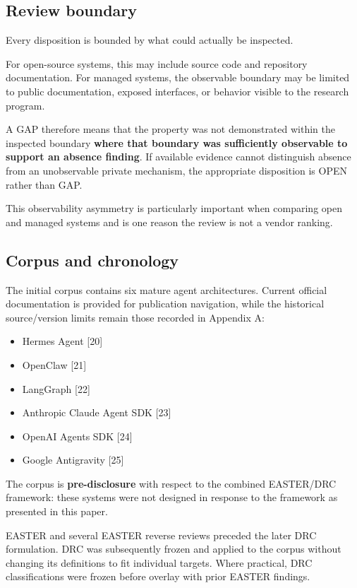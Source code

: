\documentclass[11pt]{article}
\begin{document}
\subsection{Review boundary}

Every disposition is bounded by what could actually be inspected.

For open-source systems, this may include source code and repository documentation. For managed systems, the observable boundary may be limited to public documentation, exposed interfaces, or behavior visible to the research program.

A GAP therefore means that the property was not demonstrated within the inspected boundary \textbf{where that boundary was sufficiently observable to support an absence finding}. If available evidence cannot distinguish absence from an unobservable private mechanism, the appropriate disposition is OPEN rather than GAP.

This observability asymmetry is particularly important when comparing open and managed systems and is one reason the review is not a vendor ranking.

\subsection{Corpus and chronology}

The initial corpus contains six mature agent architectures. Current official documentation is provided for publication navigation, while the historical source/version limits remain those recorded in Appendix A:

\begin{itemize}
\item Hermes Agent [20]
\item OpenClaw [21]
\item LangGraph [22]
\item Anthropic Claude Agent SDK [23]
\item OpenAI Agents SDK [24]
\item Google Antigravity [25]
\end{itemize}

The corpus is \textbf{pre-disclosure} with respect to the combined EASTER/DRC framework: these systems were not designed in response to the framework as presented in this paper.

EASTER and several EASTER reverse reviews preceded the later DRC formulation. DRC was subsequently frozen and applied to the corpus without changing its definitions to fit individual targets. Where practical, DRC classifications were frozen before overlay with prior EASTER findings.
\end{document}
